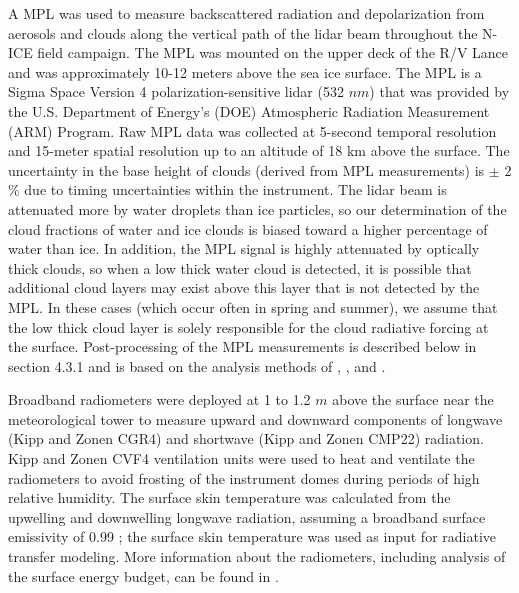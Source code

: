 A MPL was used to measure backscattered radiation and depolarization from aerosols and clouds along the vertical path of the lidar beam \citep{spinhirne} throughout the N-ICE field campaign. The MPL was mounted on the upper deck of the R/V Lance and was approximately 10-12 meters above the sea ice surface. The MPL \citep{campbell:2002} is a Sigma Space Version 4 polarization-sensitive lidar (532 $nm$) that was provided by the U.S. Department of Energy’s (DOE) Atmospheric Radiation Measurement (ARM) Program. Raw MPL data was collected at 5-second temporal resolution and 15-meter spatial resolution up to an altitude of 18 km above the surface. The uncertainty in the base height of clouds (derived from MPL measurements) is $\pm$ 2 $\%$ due to timing uncertainties within the instrument. The lidar beam is attenuated more by water droplets than ice particles, so our determination of the cloud fractions of water and ice clouds is biased toward a higher percentage of water than ice. In addition, the MPL signal is highly attenuated by optically thick clouds, so when a low thick water cloud is detected, it is possible that additional cloud layers may exist above this layer that is not detected by the MPL. In these cases (which occur often in spring and summer), we assume that the low thick cloud layer is solely responsible for the cloud radiative forcing at the surface. Post-processing of the MPL measurements is described below in section 4.3.1 and is based on the analysis methods of \citet{campbell:2002}, \citet{flynn:2007}, and \citet{stillwell:2018}.

Broadband radiometers were deployed at 1 to 1.2 $m$ above the surface near the meteorological tower to measure upward and downward components of longwave (Kipp and Zonen CGR4) and shortwave (Kipp and Zonen CMP22) radiation. Kipp and Zonen CVF4 ventilation units were used to heat and ventilate the radiometers to avoid frosting of the instrument domes during periods of high relative humidity. The surface skin temperature was calculated from the upwelling and downwelling longwave radiation, assuming a broadband surface emissivity of 0.99 \citep{grenfell:1999}; the surface skin temperature was used as input for radiative transfer modeling. More information about the radiometers, including analysis of the surface energy budget, can be found in \citet{walden:2017}.

